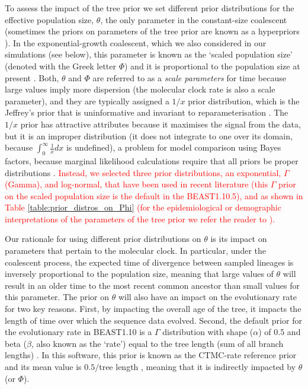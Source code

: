 \documentclass[10pt,letterpaper]{article}
\begin{document}
To assess the impact of the tree prior we set different prior distributions for the effective population size, $\theta$, the only parameter in the constant-size coalescent (sometimes the priors on parameters of the tree prior are known as a hyperpriors \cite{heath2014bayesian}). In the exponential-growth coalescent, which we also considered in our simulations (see below), this parameter is known as the `scaled population size' (denoted with the Greek letter $\Phi$) and it is proportional to the population size at present \cite{boskova2014inference}. Both, $\theta$ and $\Phi$ are referred to as a \textit{scale parameters} for time because large values imply more dispersion (the molecular clock rate is also a scale parameter), and they are typically assigned a $1/x$ prior distribution, which is the Jeffrey's prior that is uninformative and invariant to reparameterisation  \cite{drummond2002estimating}. The $1/x$ prior has attractive attributes because it maximises the signal from the data, but it is an improper distribution (it does not integrate to one over its domain, because $\int_{0}^{\infty} \frac{1}{x}dx$ is undefined), a problem for model comparison using Bayes factors, because marginal likelihood calculations require that all priors be proper distributions \cite{r2019marginal, baele2013proper}. \textcolor{red}{Instead, we selected three prior distributions, an exponential, $\Gamma$ (Gamma), and log-normal, that have been used in recent literature \cite{vogels2023phylogeographic} (this $\Gamma$ prior on the scaled population size is the default in the BEAST1.10.5), and as shown in Table \ref{table:prior_distros_on_Phi} (for the epidemiological or demographic interpretations of the parameters of the tree prior we refer the reader to \cite{featherstone2021infectious, drummond2002estimating}).}

Our rationale for using different prior distributions on $\theta$ is its impact on parameters that pertain to the molecular clock. In particular, under the coalescent process, the expected time of divergence between sampled lineages is inversely proportional to the population size, meaning that large values of $\theta$ will result in an older time to the most recent common ancestor than small values for this parameter. The prior on $\theta$ will also have an impact on the evolutionary rate for two key reasons. First, by impacting the overall age of the tree, it impacts the length of time over which the sequence data evolved. Second, the default prior for the evolutionary rate in BEAST1.10 is a $\Gamma$ distribution with shape ($\alpha$) of 0.5 and beta ($\beta$, also known as the `rate') equal to the tree length (sum of all branch lengths) \cite{wang2014priors, ferreira2008bayesian}. In this software, this prior is known as the CTMC-rate reference prior and its mean value is $0.5 /$tree length \cite{ferreira2008bayesian, gao2023model, gao2023prioritree}, meaning that it is indirectly impacted by $\theta$ (or $\Phi$). 
\end{document}

